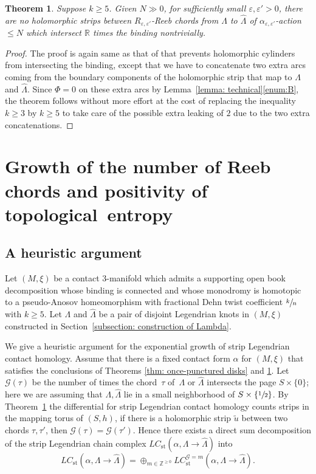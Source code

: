 \documentclass[10pt]{amsart}
\let\mathcal\mathscr
\let\ra\rightarrow
\newcommand{\st}{\mathrm{st}}
\theoremstyle{plain}
\newtheorem{thm}{Theorem}[section]
\theoremstyle{definition}
\numberwithin{equation}{subsection}
\newcommand{\RR}{\mathbb{R}}
\newcommand{\ZZ}{\mathbb{Z}}
\begin{document}
\begin{thm} \label{thm: strips}
Suppose $k\geq 5$. Given $N\gg 0$, for sufficiently small $\varepsilon,\varepsilon'>0$, there are no holomorphic strips between $R_{\varepsilon,\varepsilon'}$-Reeb chords from $\Lambda$ to $\widehat{\Lambda}$ of $\alpha_{\varepsilon,\varepsilon'}$-action $\leq N$ which intersect $\RR$ times the binding nontrivially.
\end{thm}

\begin{proof}
The proof is again same as that of \cite[Th.\,9.2]{CH2} that prevents holomorphic cylinders from intersecting the binding, except that we have to concatenate two extra arcs coming from the boundary components of the holomorphic strip that map to $\Lambda$ and $\widehat{\Lambda}$. Since $\Phi=0$ on these extra arcs by Lemma~\ref{lemma: technical}\eqref{enum:B}, the theorem follows without more effort at the cost of replacing the inequality $k\geq 3$ by $k\geq 5$ to take care of the possible extra leaking of $2$ due to the two extra concatenations.
\end{proof}

\section{Growth of the number of Reeb chords and positivity of topological~entropy}

\subsection{A heuristic argument} \label{subsection: growth}

Let $(M,\xi)$ be a contact $3$-manifold which admits a supporting open book decomposition whose binding is connected and whose monodromy is homotopic to a pseudo-Anosov homeomorphism with fractional Dehn twist coefficient $\sfrac{k}{n}$ with $k\geq 5$. Let $\Lambda$ and $\widehat{\Lambda}$ be a pair of disjoint Legendrian knots in $(M,\xi)$ constructed in Section~\ref{subsection: construction of Lambda}.

We give a heuristic argument for the exponential growth of strip Legendrian contact homology. Assume that there is a fixed contact form $\alpha$ for $(M,\xi)$ that satisfies the conclusions of Theorems \ref{thm: once-punctured disks} and \ref{thm: strips}. Let $\mathcal{G}(\tau)$ be the number of times the chord~$\tau$ of~$\Lambda$ or $\widehat\Lambda$ intersects the page $S\times\{0\}$; here we are assuming that $\Lambda,\widehat \Lambda$ lie in a small neighborhood of $S\times\{\sfrac{1}{2}\}$. By Theorem~\ref{thm: strips} the differential for strip Legendrian contact homology counts strips in the mapping torus of $(S,h)$, \ie if there is a holomorphic strip $\widetilde u$ between two chords $\tau,\tau'$, then $\mathcal{G}(\tau)=\mathcal{G}(\tau')$. Hence there exists a direct sum decomposition of the strip Legendrian chain complex $LC_{\st}(\alpha,\Lambda\ra\widehat\Lambda)$ into
$$LC_{\st}(\alpha,\Lambda\ra\widehat\Lambda)=\oplus_{m\in \ZZ^{\geq 0}} LC_{\st}^{\mathcal{G}=m} (\alpha,\Lambda\ra\widehat\Lambda).$$
\end{document}

